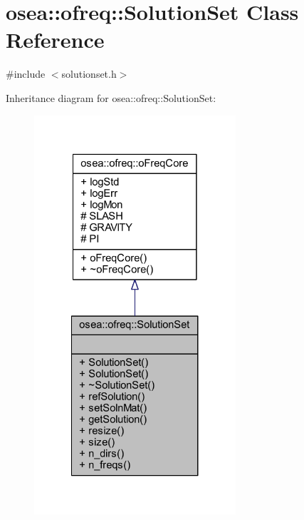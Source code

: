 \hypertarget{classosea_1_1ofreq_1_1_solution_set}{\section{osea\-:\-:ofreq\-:\-:Solution\-Set Class Reference}
\label{classosea_1_1ofreq_1_1_solution_set}
}


{\ttfamily \#include $<$solutionset.\-h$>$}



Inheritance diagram for osea\-:\-:ofreq\-:\-:Solution\-Set\-:
\nopagebreak
\begin{figure}[H]
\begin{center}
\leavevmode
\includegraphics[width=212pt]{classosea_1_1ofreq_1_1_solution_set__inherit__graph}
\end{center}
\end{figure}
